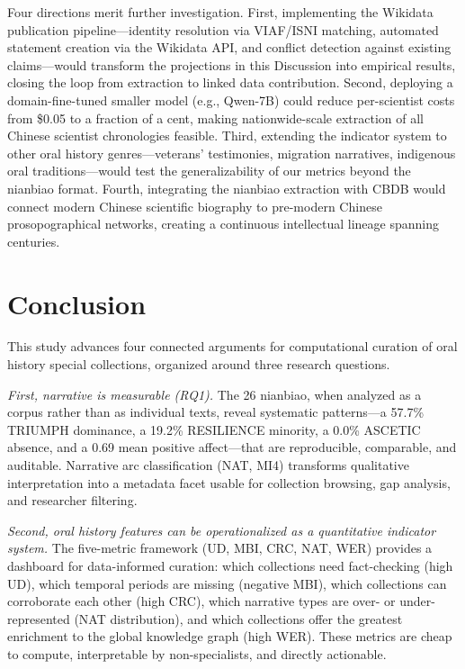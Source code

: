 \documentclass[review]{elsarticle}
\begin{document}
Four directions merit further investigation. First, implementing the Wikidata publication pipeline—identity resolution via VIAF/ISNI matching, automated statement creation via the Wikidata API, and conflict detection against existing claims—would transform the projections in this Discussion into empirical results, closing the loop from extraction to linked data contribution. Second, deploying a domain-fine-tuned smaller model (e.g., Qwen-7B) could reduce per-scientist costs from \$0.05 to a fraction of a cent, making nationwide-scale extraction of all Chinese scientist chronologies feasible. Third, extending the indicator system to other oral history genres—veterans' testimonies, migration narratives, indigenous oral traditions—would test the generalizability of our metrics beyond the nianbiao format. Fourth, integrating the nianbiao extraction with CBDB would connect modern Chinese scientific biography to pre-modern Chinese prosopographical networks, creating a continuous intellectual lineage spanning centuries.

\section{Conclusion}

This study advances four connected arguments for computational curation of oral history special collections, organized around three research questions.

\textit{First, narrative is measurable (RQ1).} The 26 nianbiao, when analyzed as a corpus rather than as individual texts, reveal systematic patterns—a 57.7\% TRIUMPH dominance, a 19.2\% RESILIENCE minority, a 0.0\% ASCETIC absence, and a 0.69 mean positive affect—that are reproducible, comparable, and auditable. Narrative arc classification (NAT, MI4) transforms qualitative interpretation into a metadata facet usable for collection browsing, gap analysis, and researcher filtering.

\textit{Second, oral history features can be operationalized as a quantitative indicator system.} The five-metric framework (UD, MBI, CRC, NAT, WER) provides a dashboard for data-informed curation: which collections need fact-checking (high UD), which temporal periods are missing (negative MBI), which collections can corroborate each other (high CRC), which narrative types are over- or under-represented (NAT distribution), and which collections offer the greatest enrichment to the global knowledge graph (high WER). These metrics are cheap to compute, interpretable by non-specialists, and directly actionable.
\end{document}
